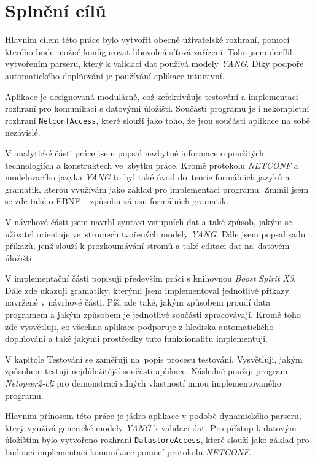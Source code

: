 \documentclass[thesis=B,czech,hidelinks]{FITthesis}[2019/03/06]
\begin{document}
\section{Splnění cílů}
Hlavním cílem této práce bylo vytvořit obecné uživatelské rozhraní, pomocí kterého bude možné konfigurovat libovolná síťová zařízení. Toho jsem docílil vytvořením parseru, který k validaci dat používá modely \textit{YANG}. Díky podpoře automatického doplňování je používání aplikace intuitivní.

Aplikace je designovaná modulárně, což zefektivňuje testování a implementaci rozhraní pro komunikaci s datovými úložišti. Součástí programu je i nekompletní rozhraní \texttt{NetconfAccess}, které slouží jako  toho, že jsou součásti aplikace na sobě nezávislé.


\begin{conclusion}
V analytické části práce jsem popsal nezbytné informace o použitých technologiích a konstruktech ve~zbytku práce. Kromě protokolu \textit{NETCONF} a modelovacího jazyka \textit{YANG} to byl také úvod do~teorie formálních jazyků a gramatik, kterou využívám jako základ pro implementaci programu. Zmínil jsem se zde také o EBNF -- způsobu zápisu formálních gramatik.

V návrhové části jsem navrhl syntaxi vstupních dat a také způsob, jakým se uživatel orientuje ve~stromech tvořených modely \textit{YANG}. Dále jsem popsal sadu příkazů, jenž slouží k prozkoumávání stromů a také editaci dat na~datovém úložišti.

V implementační části popisuji především práci s knihovnou \textit{Boost Spirit X3}. Dále zde ukazuji gramatiky, kterými jsem implementoval jednotlivé příkazy navržené v návrhové části. Píši zde také, jakým způsobem proudí data programem a jakým způsobem je jednotlivé součásti zpracovávají. Kromě toho zde vysvětluji, co všechno aplikace podporuje z hlediska automatického doplňování a také jakými prostředky tuto funkcionalitu implementuji.

V kapitole Testování se zaměřuji na~popis procesu testování. Vysvětluji, jakým způsobem testuji nejdůležitější součásti aplikace. Následně použiji program \textit{Netopeer2-cli} pro demonstraci silných vlastností mnou implementovaného programu.

Hlavním přínosem této práce je jádro aplikace v podobě dynamického parseru, který využívá generické modely \textit{YANG} k validaci dat. Pro přístup k datovým úložištím bylo vytvořeno rozhraní \texttt{DatastoreAccess}, které slouží jako základ pro budoucí implementaci komunikace pomocí protokolu \textit{NETCONF}.
\end{conclusion}
\end{document}
